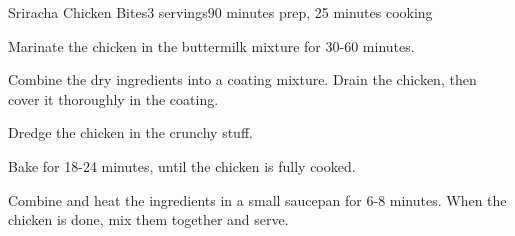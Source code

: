\documentclass[../Cookbook.tex]{subfiles}
\begin{document}
\begin{recipe}{Sriracha Chicken Bites}{3 servings}{90 minutes prep, 25 minutes cooking}

	Marinate the chicken in the buttermilk mixture for 30-60 minutes.

	Combine the dry ingredients into a coating mixture. Drain the chicken, then cover it thoroughly in the coating.

	Dredge the chicken in the crunchy stuff.

	Bake for 18-24 minutes, until the chicken is fully cooked.

	Combine and heat the ingredients in a small saucepan for 6-8 minutes. When the chicken is done, mix them together and serve.

\end{recipe}
\end{document}

